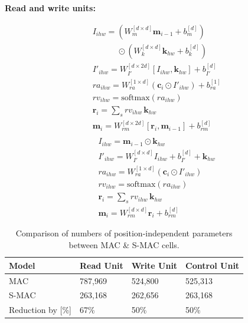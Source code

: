 \documentclass[paperwidth=36in,paperheight=48in,portrait,fontscale=0.36]{baposter}
\newcommand{\cc}{\mathbf{c}}
\newcommand{\kb}{\mathbf{k}}
\newcommand{\mem}{\mathbf{m}}
\newcommand{\rr}{\mathbf{r}}
\begin{document}
\begin{poster}
{\noindent\textbf{Read and write units:}
\begin{multicols}{2}
	\noindent
	\begin{align*}
		&I_{ihw} = (W_{m}^{[d \times d]} \mem_{i-1} + b_{m}^{[d]}) \\
		& \qquad \quad \odot (W_{k}^{[d \times d]} \kb_{hw} + b_{k}^{[d]}) \tag{r1} \\
		&I'_{ihw} =  W_{I'}^{[d \times 2d]} [I_{ihw},\kb_{hw}]  + b_{I'}^{[d]}  \tag{r2} \\
		&ra_{ihw} = W_{ra}^{[1 \times d]} (\cc_i \odot I'_{ihw}) + b_{ra}^{[1]} \tag{r3.1}\\
		&rv_{ihw} = \textrm{softmax}(ra_{ihw}) \tag{r3.2}\\
		&\rr_i = \sum_s rv_{ihw} \, \kb_{hw}  \tag{r3.3}\\
		&\mem_i = W_{rm}^{[d \times 2d]} [\rr_i, \mem_{i-1}]  + b_{rm}^{[d]} \tag{w1}
	\end{align*}
	\columnbreak
	{\begin{align*}
		&\\
		&I_{ihw} = \mem_{i-1} \odot \kb_{hw} \tag{r1} \\ 
		&I'_{ihw} = W_{I'}^{[d \times d]} I_{ihw} + b_{I'}^{[d]} + \kb_{hw} \tag{r2} \\
		&ra_{ihw} = W_{ra}^{[1 \times d]} (\cc_i \odot I'_{ihw})  \tag{r3.1}\\
		&rv_{ihw} = \textrm{softmax}(ra_{ihw}) \tag{r3.2}\\
		&\rr_i = \sum_s rv_{ihw} \, \kb_{hw}  \tag{r3.3}\\
		&\mem_i = W_{rm}^{[d \times d]} \rr_i + b_{rm}^{[d]} \tag{w1}
	\end{align*}}
\end{multicols}

\vspace{-15pt}
\begin{table}[H]
	\centering
	\caption{Comparison of numbers of position-independent parameters between MAC \& S-MAC cells.}
	\begin{tabular}{llll}
		\toprule
		Model        & Read Unit               & Write Unit &  Control Unit         \\
		\midrule
		MAC   &  787,969 &  524,800        &    525,313    \\
		S-MAC & 263,168  & 262,656       &    263,168 \\
		\midrule
		Reduction by [\%]  & 67\%  &   50\%       &      50\%  \\
		\bottomrule
	\end{tabular}
	\label{tab:mac_cell_parameters}
\end{table}

}
\end{poster}
\end{document}
